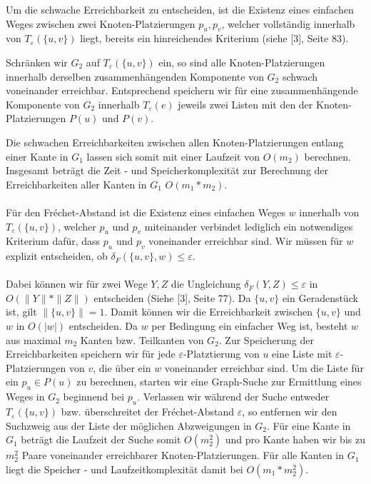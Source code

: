 \documentclass[a4paper, 12pt, twoside]{article}
\theoremstyle{Format1} %
\begin{document}
Um die schwache Erreichbarkeit zu entscheiden, ist die Existenz eines einfachen Weges zwischen zwei Knoten-Platzierungen
$p_u,p_v$, welcher vollständig innerhalb von $T_{\varepsilon}(\{u,v\})$ liegt, bereits ein hinreichendes Kriterium (siehe [3], Seite 83).

Schränken wir $G_2$ auf $T_{\varepsilon}(\{u,v\})$ ein, so sind alle Knoten-Platzierungen innerhalb derselben zusammenhängenden Komponente von $G_2$
schwach voneinander erreichbar. Entsprechend speichern wir für eine zusammenhängende Komponente von $G_2$ innerhalb $T_{\varepsilon}(e)$ jeweils zwei Listen mit den
der Knoten-Platzierungen $P(u)$ und $P(v)$.

Die schwachen Erreichbarkeiten zwischen allen Knoten-Platzierungen entlang einer Kante in $G_1$ lassen sich somit mit einer Laufzeit von $O(m_2)$ berechnen.
Insgesamt beträgt die Zeit - und Speicherkomplexität zur Berechnung der Erreichbarkeiten aller Kanten in $G_1$ $O(m_1*m_2)$.
\\
\\
Für den Fréchet-Abstand ist die Existenz eines einfachen Weges $w$ innerhalb von $T_{\varepsilon}(\{u,v\})$, welcher $p_u$ und $p_v$ miteinander verbindet
lediglich ein notwendiges Kriterium dafür, dass $p_u$ und $p_v$ voneinander erreichbar sind. Wir müssen für $w$ explizit entscheiden,
ob $\delta_F(\{u,v\}, w) \leq \varepsilon$.
\\
\\
Dabei können wir für zwei Wege $Y,Z$ die Ungleichung $\delta_F(Y,Z) \leq \varepsilon$ in $O(\|Y\|*\|Z\|)$ entscheiden (Siehe [3], Seite 77).
Da $\{u,v\}$ ein Geradenstück ist, gilt $\|\{u,v\}\| = 1$. Damit können wir die Erreichbarkeit zwischen $\{u,v\}$ und $w$ in $O(|w|)$ entscheiden.
Da $w$ per Bedingung ein einfacher Weg ist, besteht $w$ aus maximal $m_2$ Kanten bzw. Teilkanten von $G_2$.
Zur Speicherung der Erreichbarkeiten speichern wir für jede $\varepsilon$-Platztierung von $u$ eine Liste mit $\varepsilon$-Platzierungen von $v$, die
über ein $w$ voneinander erreichbar sind. Um die Liste für ein $p_u \in P(u)$ zu berechnen, starten wir eine Graph-Suche zur Ermittlung eines
Weges in $G_2$ beginnend bei $p_u$. Verlassen wir während der Suche entweder $T_{\varepsilon}(\{u,v\})$ bzw. überschreitet der Fréchet-Abstand $\varepsilon$,
so entfernen wir den Suchzweig aus der Liste der möglichen Abzweigungen in $G_2$.
Für eine Kante in $G_1$ beträgt die Laufzeit der Suche somit $O(m_2^2)$ und pro Kante haben wir bis zu $m_2^2$ Paare voneinander erreichbarer Knoten-Platzierungen.
Für alle Kanten in $G_1$ liegt die Speicher - und Laufzeitkomplexität damit bei $O(m_1*m_2^2)$.
\end{document}
